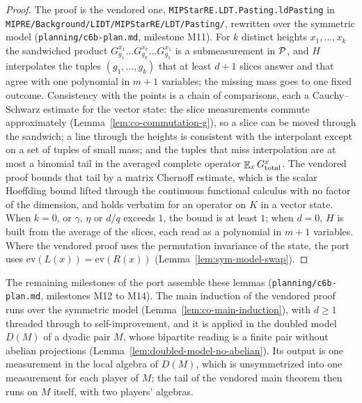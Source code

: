 \begin{proof}
\leanok
The proof is the vendored one, \texttt{MIPStarRE.LDT.Pasting.ldPasting} in
\texttt{MIPRE/Background/LIDT/MIPStarRE/LDT/Pasting/}, rewritten over the symmetric model
(\texttt{planning/c6b-plan.md}, milestone M11). For $k$ distinct heights $x_1, \dots, x_k$ the
sandwiched product $G^{x_1}_{g_1} \dots G^{x_k}_{g_k} \dots G^{x_1}_{g_1}$ is a submeasurement
in $\cal{P}$, and $H$ interpolates the tuples $(g_1, \dots, g_k)$ that at least $d + 1$ slices
answer and that agree with one polynomial in $m + 1$ variables; the missing mass goes to one
fixed outcome. Consistency with the points is a chain of comparisons, each a Cauchy--Schwarz
estimate for the vector state: the slice measurements commute approximately
(Lemma~\ref{lem:co-commutation-g}), so a slice can be moved through the sandwich; a line through
the heights is consistent with the interpolant except on a set of tuples of small mass; and the
tuples that miss interpolation are at most a binomial tail in the averaged complete operator
$\E_x G^x_{\mathrm{total}}$. The vendored proof bounds that tail by a matrix Chernoff estimate,
which is the scalar Hoeffding bound lifted through the continuous functional calculus with no
factor of the dimension, and holds verbatim for an operator on $K$ in a vector state. When $k =
0$, or $\gamma$, $\eta$ or $d/q$ exceeds $1$, the bound is at least $1$; when $d = 0$, $H$ is
built from the average of the slices, each read as a polynomial in $m + 1$ variables. Where the vendored proof uses the permutation
invariance of the state, the port uses $\mathrm{ev}(L(x)) = \mathrm{ev}(R(x))$
(Lemma~\ref{lem:sym-model-swap}).
\end{proof}

The remaining milestones of the port assemble these lemmas (\texttt{planning/c6b-plan.md},
milestones M12 to M14). The main induction of the vendored proof runs over the symmetric model
(Lemma~\ref{lem:co-main-induction}), with $d \geq 1$ threaded through to self-improvement, and it
is applied in the doubled model $D(M)$ of a dyadic pair $M$, whose bipartite reading is a finite
pair without abelian projections (Lemma~\ref{lem:doubled-model-no-abelian}). Its output is one
measurement in the local algebra of $D(M)$, which is unsymmetrized into one measurement for each
player of $M$; the tail of the vendored main theorem then runs on $M$ itself, with two players'
algebras.

